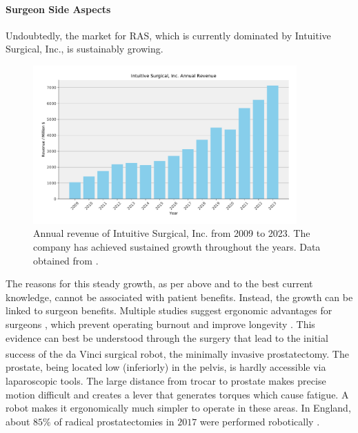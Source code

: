 \paragraph{Surgeon Side Aspects} Undoubtedly, the market for RAS, which is currently dominated by Intuitive Surgical, Inc., is sustainably growing. 

\begin{figure}[tb]
    \centering
    \includegraphics[width=0.9\textwidth]{introduction/fig/intuitive_revenue.pdf}
    \caption{Annual revenue of Intuitive Surgical, Inc. from 2009 to 2023. The company has achieved sustained growth throughout the years. Data obtained from \cite{intuitiverevenue}.}
    \label{in:fig:intuitive_revenue}
\end{figure}

The reasons for this steady growth, as per above and to the best current knowledge, cannot be associated with patient benefits. Instead, the growth can be linked to surgeon benefits. Multiple studies suggest ergonomic advantages for surgeons \cite{monfared2022comparison, zarate2019ergonomic}, which prevent operating burnout \cite{wells2019operating} and improve longevity \cite{stucky2018surgeon}. This evidence can best be understood through the surgery that lead to the initial success of the da Vinci\textsuperscript{\textregistered} surgical robot, the minimally invasive prostatectomy. The prostate, being located low (inferiorly) in the pelvis, is hardly accessible via laparoscopic tools. The large distance from trocar to prostate makes precise motion difficult and creates a lever that generates torques which cause fatigue. A robot makes it ergonomically much simpler to operate in these areas. In England, about $85\%$ of radical prostatectomies in $2017$ were performed robotically \cite{maynou2021patterns}.

